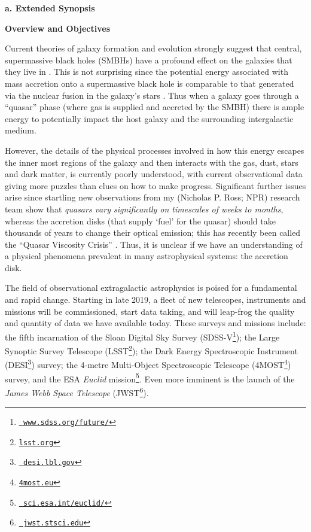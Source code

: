 \documentclass[oneside, a4paper, onecolumn, 11pt]{article}
\begin{document}
\vspace{-16pt}

\smallskip
\smallskip
\noindent
{\bf{\textcolor{Cerulean}{a. Extended Synopsis}}} 
\vspace{6pt}

\noindent
\large
{\bf{\textcolor{Cerulean}{Overview and Objectives}}}
\normalsize

\smallskip
\noindent
Current theories of galaxy formation and evolution strongly suggest
that central, supermassive black holes (SMBHs) have a profound effect
on the galaxies that they live in 
\citep[e.g., ][]{KormendyHo2013}.  
This is not surprising
since the potential energy associated with mass accretion onto a
supermassive black hole is comparable to that generated via the
nuclear fusion in the galaxy's stars \citep[see
e.g. ][]{Fabian2012}. Thus when a galaxy goes through a ``quasar''
phase (where gas is supplied and accreted by the SMBH) there is ample
energy to potentially impact the host galaxy and the surrounding
intergalactic medium.

\smallskip
\smallskip
\noindent
However, the details of the physical processes involved in how this
energy escapes the inner most regions of the galaxy and then interacts
with the gas, dust, stars and dark matter, is currently poorly
understood, with current observational data giving more puzzles than
clues on how to make progress. Significant further issues arise since
startling new observations from my (Nicholas P. Ross; NPR) research
team \citep{MacLeod2016, Ross2018} show that {\it quasars vary
significantly on timescales of weeks to months}, whereas the accretion
disks (that supply `fuel' for the quasar) should take thousands of
years to change their optical emission; this has recently been called
the ``Quasar Viscosity Crisis'' \citep[e.g., ][]{Lawrence2018}. Thus,
it is unclear if we have an understanding of a physical phenomena
prevalent in many astrophysical systems: the accretion disk.

\smallskip
\smallskip
\noindent
The field of observational extragalactic astrophysics is poised for a
fundamental and rapid change. Starting in late 2019, a fleet of new
telescopes, instruments and missions will be commissioned, start data
taking, and will leap-frog the quality and quantity of data we have
available today. These surveys and missions include: the fifth
incarnation of the Sloan Digital Sky Survey
(SDSS-V\footnote{\href{www.sdss.org/future/}{{\tt
www.sdss.org/future/}}}); the Large Synoptic Survey Telescope
(LSST\footnote{\href{lsst.org}{{\tt lsst.org}}}); the Dark Energy
Spectroscopic Instrument (DESI\footnote{\href{desi.lbl.gov}{{\tt
desi.lbl.gov}}}) survey; the 4-metre Multi-Object Spectroscopic
Telescope (4MOST\footnote{\href{4most.eu}{{\tt 4most.eu}}}) survey,
and the ESA {\it Euclid}
mission\footnote{\href{sci.esa.int/euclid/}{{\tt
sci.esa.int/euclid/}}}. Even more imminent is the launch of the {\it
James Webb Space Telescope} (JWST\footnote{\href{jwst.stsci.edu}{{\tt
jwst.stsci.edu}}}).
\end{document}
